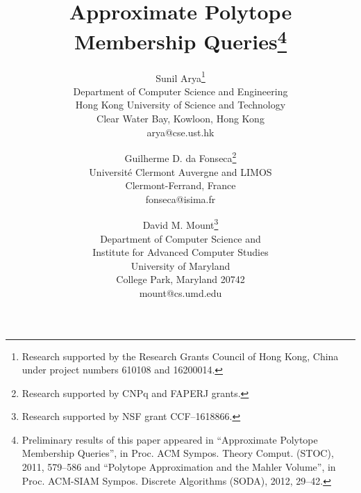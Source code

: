 \documentclass[11pt]{article}   \usepackage[letterpaper,hmargin=2.1cm,vmargin=3cm]{geometry}
\begin{document}
\title{Approximate Polytope Membership Queries\thanks{Preliminary results of this paper appeared in ``Approximate Polytope Membership Queries'', in
Proc. ACM Sympos. Theory Comput. (STOC), 2011, 579--586 and ``Polytope Approximation and the Mahler Volume'', in Proc. ACM-SIAM Sympos. Discrete Algorithms (SODA), 2012, 29--42.}
}

\author{Sunil Arya\thanks{Research supported by the Research Grants Council of Hong Kong, China under project numbers 610108 and 16200014.}\\
		Department of Computer Science and Engineering \\
		Hong Kong University of Science and Technology \\
		Clear Water Bay, Kowloon, Hong Kong\\
		arya@cse.ust.hk \\
		\and
	Guilherme D. da Fonseca\thanks{Research supported by CNPq and FAPERJ grants.}\\
		Universit\'e Clermont Auvergne and LIMOS \\
		Clermont-Ferrand, France\\
		fonseca@isima.fr \\
		\and
	David M. Mount\thanks{Research supported by NSF grant CCF--1618866.}\\
		Department of Computer Science and \\
		Institute for Advanced Computer Studies \\
		University of Maryland \\
		College Park, Maryland 20742 \\
		mount@cs.umd.edu \\
}

\date{}

\maketitle
\end{document}
